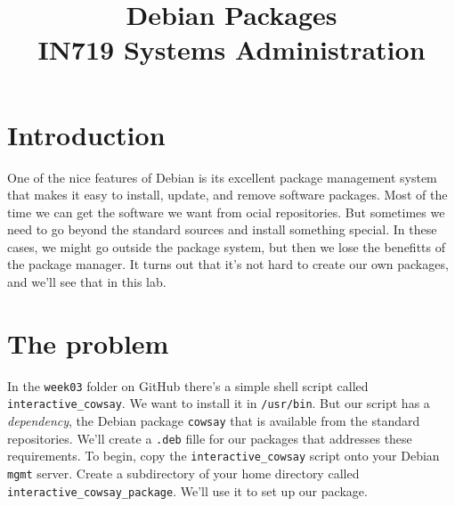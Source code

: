 \documentclass{article}
\begin{document}
\title{Debian Packages\\ IN719 Systems Administration}
\date{}
\maketitle

\section{Introduction}
One of the nice features of Debian is its excellent package management system
that makes it easy to install, update, and remove software packages. Most of 
the time we can get the software we want from ocial repositories. But 
sometimes we need to go beyond the standard sources and install something 
special. In these cases, we might go outside the package system, but then we 
lose the benefitts of the package manager.  It turns out that it's not hard to 
create our own packages, and we'll see that in this lab.  

\section{The problem}
In the \texttt{week03} folder on GitHub there's a simple shell script called \texttt{interactive\_cowsay}. We want to
install it in \texttt{/usr/bin}. But our script has a \emph{dependency}, the Debian package \texttt{cowsay} that is available from
the standard repositories. We'll create a \texttt{.deb} fille for our packages that addresses these requirements. To
begin, copy the \texttt{interactive\_cowsay} script onto your Debian \texttt{mgmt} server. Create a subdirectory of your home
directory called \texttt{interactive\_cowsay\_package}. We'll use it to set up our package.
\end{document}
